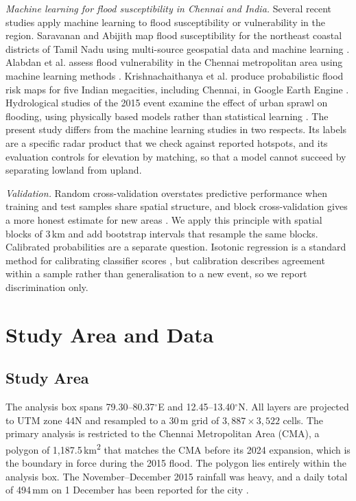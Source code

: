 \documentclass[conference]{IEEEtran}
\begin{document}
\textit{Machine learning for flood susceptibility in Chennai and India.} Several recent studies apply machine learning to flood susceptibility or vulnerability in the region. Saravanan and Abijith map flood susceptibility for the northeast coastal districts of Tamil Nadu using multi-source geospatial data and machine learning \cite{saravanan2022}. Alabdan et al. assess flood vulnerability in the Chennai metropolitan area using machine learning methods \cite{alabdan2025}. Krishnachaithanya et al. produce probabilistic flood risk maps for five Indian megacities, including Chennai, in Google Earth Engine \cite{krishnachaithanya2025}. Hydrological studies of the 2015 event examine the effect of urban sprawl on flooding, using physically based models rather than statistical learning \cite{nithiladevi2019}. The present study differs from the machine learning studies in two respects. Its labels are a specific radar product that we check against reported hotspots, and its evaluation controls for elevation by matching, so that a model cannot succeed by separating lowland from upland.

\textit{Validation.} Random cross-validation overstates predictive performance when training and test samples share spatial structure, and block cross-validation gives a more honest estimate for new areas \cite{roberts2017}. We apply this principle with spatial blocks of 3\,km and add bootstrap intervals that resample the same blocks. Calibrated probabilities are a separate question. Isotonic regression is a standard method for calibrating classifier scores \cite{zadrozny2002}, but calibration describes agreement within a sample rather than generalisation to a new event, so we report discrimination only.

\section{Study Area and Data}\label{sec:data}

\subsection{Study Area}
The analysis box spans 79.30--80.37$^\circ$E and 12.45--13.40$^\circ$N. All layers are projected to UTM zone 44N and resampled to a 30\,m grid of $3{,}887 \times 3{,}522$ cells. The primary analysis is restricted to the Chennai Metropolitan Area (CMA), a polygon of 1,187.5\,km\textsuperscript{2} that matches the CMA before its 2024 expansion, which is the boundary in force during the 2015 flood. The polygon lies entirely within the analysis box. The November--December 2015 rainfall was heavy, and a daily total of 494\,mm on 1 December has been reported for the city \cite{nithiladevi2019}.
\end{document}
